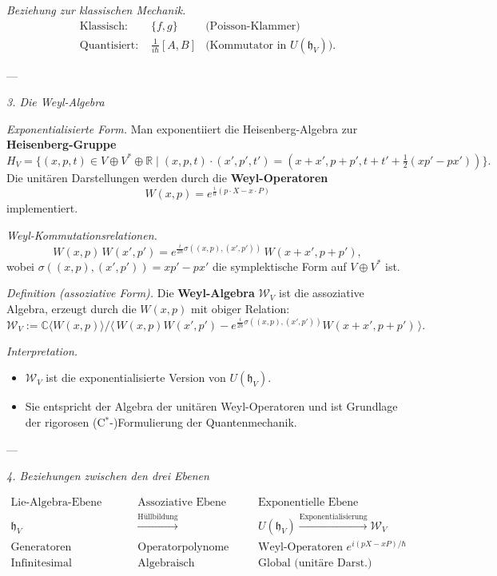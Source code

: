 \documentclass[10pt, letterpaper]{article}
\newcommand{\R}{\mathbb{R}}
\newcommand{\C}{\mathbb{C}}
\begin{document}
\emph{Beziehung zur klassischen Mechanik.}
\[
\begin{array}{ccc}
\text{Klassisch: } & \{f,g\} & \text{(Poisson-Klammer)}\\
\text{Quantisiert: } & \frac{1}{i\hbar}[A,B] & \text{(Kommutator in }U(\mathfrak{h}_V)).
\end{array}
\]

---

\emph{3. Die Weyl-Algebra}

\emph{Exponentialisierte Form.}
Man exponentiiert die Heisenberg-Algebra zur
\textbf{Heisenberg-Gruppe}
\[
H_V = \{(x,p,t)\in V\oplus V^\ast\oplus\R\mid
(x,p,t)\cdot(x',p',t')=(x+x',p+p',t+t'+\tfrac{1}{2}(xp'-px'))\}.
\]
Die unitären Darstellungen werden durch die
\textbf{Weyl-Operatoren}
\[
W(x,p) = e^{\frac{i}{\hbar}(p\cdot X - x\cdot P)}
\]
implementiert.

\emph{Weyl-Kommutationsrelationen.}
\[
W(x,p)\,W(x',p') = 
e^{\frac{i}{2\hbar}\sigma((x,p),(x',p'))}\,W(x+x',p+p'),
\]
wobei \(\sigma((x,p),(x',p')) = xp' - px'\)
die symplektische Form auf \(V\oplus V^\ast\) ist.

\emph{Definition (assoziative Form).}
Die \textbf{Weyl-Algebra} \(\mathcal{W}_V\) ist die assoziative Algebra,
erzeugt durch die \(W(x,p)\) mit obiger Relation:
\[
\mathcal{W}_V :=
\C\langle W(x,p)\rangle
\big/
\langle\, W(x,p)W(x',p') - e^{\frac{i}{2\hbar}\sigma((x,p),(x',p'))}
   W(x+x',p+p')\,\rangle.
\]

\emph{Interpretation.}
\begin{itemize}
  \item \(\mathcal{W}_V\) ist die exponentialisierte Version von \(U(\mathfrak{h}_V)\).
  \item Sie entspricht der Algebra der unitären Weyl-Operatoren
        und ist Grundlage der rigorosen (C$^\ast$-)Formulierung der Quantenmechanik.
\end{itemize}

---

\emph{4. Beziehungen zwischen den drei Ebenen}

\[
\boxed{
\begin{array}{ccc}
\text{Lie-Algebra-Ebene} & \text{Assoziative Ebene} & \text{Exponentielle Ebene}\\[2pt]
\mathfrak{h}_V & \xrightarrow{\text{Hüllbildung}} & U(\mathfrak{h}_V) 
\xrightarrow{\text{Exponentialisierung}} \mathcal{W}_V\\[6pt]
\text{Generatoren} & \text{Operatorpolynome} & \text{Weyl-Operatoren } e^{i(pX-xP)/\hbar}\\[4pt]
\text{Infinitesimal (Kinematik)} & \text{Algebraisch (Dynamik)} & \text{Global (unitäre Darst.)}
\end{array}
}
\]
\end{document}
